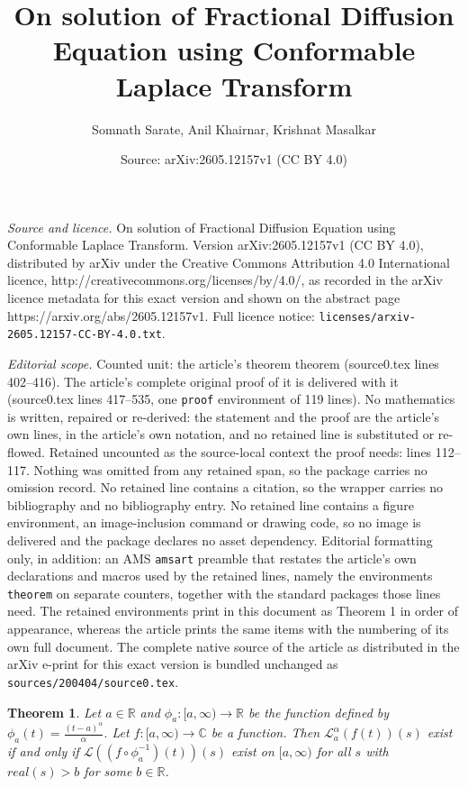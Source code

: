 \documentclass[10pt,a4paper]{amsart}
\title{On solution of Fractional Diffusion Equation using Conformable Laplace Transform}
\author{Somnath Sarate, Anil Khairnar, Krishnat Masalkar}
\date{Source: arXiv:2605.12157v1 (CC BY 4.0)}
\newtheorem{theorem}{Theorem}
\begin{document}
\maketitle

\noindent\emph{Source and licence.} On solution of Fractional Diffusion Equation using Conformable Laplace Transform. Version arXiv:2605.12157v1 (CC BY 4.0), distributed by arXiv under the Creative Commons Attribution 4.0 International licence, http://creativecommons.org/licenses/by/4.0/, as recorded in the arXiv licence metadata for this exact version and shown on the abstract page https://arxiv.org/abs/2605.12157v1. Full licence notice: \texttt{licenses/arxiv-2605.12157-CC-BY-4.0.txt}.\par\smallskip

\noindent\textit{Editorial scope.} Counted unit: the article's theorem theorem (source0.tex lines 402--416). The article's complete original proof of it is delivered with it (source0.tex lines 417--535, one \texttt{proof} environment of 119 lines). No mathematics is written, repaired or re-derived: the statement and the proof are the article's own lines, in the article's own notation, and no retained line is substituted or re-flowed.  Retained uncounted as the source-local context the proof needs: lines 112--117.  Nothing was omitted from any retained span, so the package carries no omission record.  No retained line contains a citation, so the wrapper carries no bibliography and no bibliography entry.  No retained line contains a figure environment, an image-inclusion command or drawing code, so no image is delivered and the package declares no asset dependency.  Editorial formatting only, in addition: an AMS \texttt{amsart} preamble that restates the article's own declarations and macros used by the retained lines, namely the environments \texttt{theorem} on separate counters, together with the standard packages those lines need.  The retained environments print in this document as Theorem 1 in order of appearance, whereas the article prints the same items with the numbering of its own full document.  The complete native source of the article as distributed in the arXiv e-print for this exact version is bundled unchanged as \texttt{sources/200404/source0.tex}.
\begin{theorem}
\label{thm:2.1}
	Let $a\in \mathbb R$ and $\phi_a:[a,\infty)\rightarrow \mathbb R$ be the function defined by
	$\phi_a(t)=\frac{(t-a)^{\alpha}}{\alpha}.$
	Let $f:[a, \infty) \rightarrow \mathbb C$ be a function. Then $\mathcal{L}_{a}^{\alpha}(f(t))(s)$ exist if and only if $\mathcal{L}((f\circ\phi_a^{-1})(t))(s)$ exist on $[a,\infty)$ for all $s$ with $real(s)>b$ for some $b\in \mathbb R$. 
\end{theorem}
\end{document}
